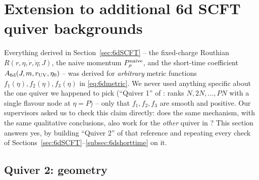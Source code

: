 \documentclass[11pt]{article}
\begin{document}
\section{Extension to additional 6d SCFT quiver backgrounds}
\label{sec:quiver2}

Everything derived in Section~\ref{sec:6dSCFT} -- the fixed-charge Routhian $R(r,\eta,\dot r,\dot\eta;J)$, the naive momentum $P_\rho^{\rm naive}$, and the short-time coefficient $A_{\rm 6d}(J,m,r_{\rm UV},\eta_0)$ -- was derived for \emph{arbitrary} metric functions $f_1(\eta),f_2(\eta),f_3(\eta)$ in \eqref{eq:6dmetric}. We never used anything specific about the one quiver we happened to pick (``Quiver 1'' of \cite{Fatemiabhari:2026rob}: ranks $N,2N,\dots,PN$ with a single flavour node at $\eta=P$) -- only that $f_1,f_2,f_3$ are smooth and positive. Our supervisors asked us to check this claim directly: does the same mechanism, with the same qualitative conclusions, also work for the \emph{other} quiver in \cite{Fatemiabhari:2026rob}? This section answers yes, by building ``Quiver 2'' of that reference and repeating every check of Sections~\ref{sec:6dSCFT}--\ref{subsec:6dshorttime} on it.

\subsection{Quiver 2: geometry}
\label{subsec:quiver2geometry}
\end{document}
